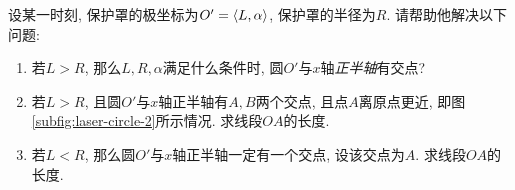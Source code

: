 \begin{enumerate}
        设某一时刻, 保护罩的极坐标为$O'=\braket{L,\alpha}$,
        保护罩的半径为$R$. 请帮助他解决以下问题:

        \begin{enumerate}[label=(\alph*)]
          \item 若$L>R$, 那么$L,R,\alpha$满足什么条件时,
                圆$O'$与$x$轴\emph{正半轴}有交点?
          \item 若$L>R$, 且圆$O'$与$x$轴正半轴有$A,B$两个交点,
                且点$A$离原点更近,
                即图\ref{subfig:laser-circle-2}所示情况.
                求线段$OA$的长度.
          \item 若$L<R$, 那么圆$O'$与$x$轴正半轴一定有一个交点,
                设该交点为$A$. 求线段$OA$的长度.
        \end{enumerate}
\end{enumerate}

